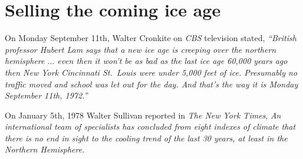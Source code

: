 \chapter{Selling the coming ice age}


On  Monday September 11th,
Walter Cronkite on {\em CBS} television stated,\cite{Cronkite-1972}
{\em ``British professor Hubert Lam says that a
new ice age is creeping over the
northern hemisphere
$\ldots$
even then it won't
be as bad as the last ice age 60,000
years ago then New York Cincinnati St.~Louis were under 5,000 feet of ice.
Presumably no traffic moved and school
was let out for the day. And that's the
way it is Monday September 11th, 1972.''}


On January 5th, 1978 Walter Sullivan  reported in {\em The New York Times},\cite{Sullivan-1978}
{\em An international team of specialists has concluded from eight indexes of climate that there is no end in sight to the cooling trend of the last 30 years,
at least in the Northern Hemisphere.}
